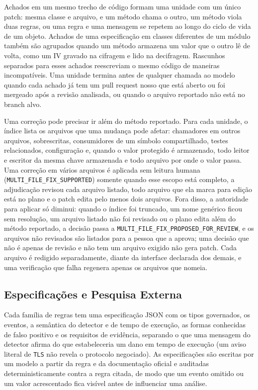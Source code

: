 \documentclass[conference]{IEEEtran}
\begin{document}
Achados em um mesmo trecho de código formam uma unidade com um único patch:
mesma classe e arquivo, e um método chama o outro, um método viola duas regras,
ou uma regra e uma mensagem se repetem ao longo do ciclo de vida de um objeto.
Achados de uma especificação em classes diferentes de um módulo também são
agrupados quando um método armazena um valor que o outro lê de volta, como um
IV gravado na cifragem e lido na decifragem. Rascunhos separados para esses
achados reescreviam o mesmo código de maneiras incompatíveis. Uma unidade
termina antes de qualquer chamada ao modelo quando cada achado já tem um pull
request nosso que está aberto ou foi mergeado após a revisão analisada, ou
quando o arquivo reportado não está no branch alvo.

Uma correção pode precisar ir além do método reportado. Para cada unidade, o
índice lista os arquivos que uma mudança pode afetar: chamadores em outros
arquivos, sobrescritas, consumidores de um símbolo compartilhado, testes
relacionados, configuração e, quando o valor protegido é armazenado, todo leitor
e escritor da mesma chave armazenada e todo arquivo por onde o valor passa. Uma
correção em vários arquivos é aplicada sem leitura humana
(\texttt{MULTI\_FILE\_FIX\_SUPPORTED}) somente quando esse escopo está completo,
a adjudicação revisou cada arquivo listado, todo arquivo que ela marca para
edição está no plano e o patch edita pelo menos dois arquivos. Fora disso, a
autoridade para aplicar só diminui: quando o índice foi truncado, um nome genérico ficou sem
resolução, um arquivo listado não foi revisado ou o plano edita além do método
reportado, a decisão passa a
\texttt{MULTI\_FILE\_FIX\_}\allowbreak\texttt{PROPOSED\_FOR\_REVIEW}, e os
arquivos não revisados são listados para a pessoa que a aprova; uma decisão que
não é apenas de revisão e não tem um arquivo exigido não gera patch. Cada
arquivo é redigido separadamente, diante da interface declarada dos demais, e
uma verificação que falha regenera apenas os arquivos que nomeia.

\subsection{Especificações e Pesquisa Externa}

Cada família de regras tem uma especificação JSON com os tipos governados, os
eventos, a semântica do detector e de tempo de execução, as formas conhecidas
de falso positivo e os requisitos de evidência, separando o que uma mensagem do
detector afirma do que estabeleceria um dano em tempo de execução (um aviso
literal de \texttt{TLS} não revela o protocolo negociado). As especificações
são escritas por um modelo a partir da regra e da documentação oficial e
auditadas deterministicamente contra a regra citada, de modo que um evento
omitido ou um valor acrescentado fica visível antes de influenciar uma análise.
\end{document}
